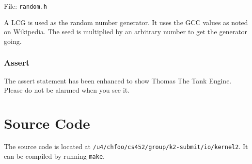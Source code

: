 \documentclass[letterpaper, 12pt]{article}
\begin{document}
File: \texttt{random.h}

A LCG is used as the random number generator. It uses the GCC values as noted on Wikipedia. The seed is multiplied by an arbitrary number to get the generator going.


\subsubsection{Assert%
  \label{assert}%
}

The assert statement has been enhanced to show Thomas The Tank Engine. Please do not be alarmed when you see it.


\section{Source Code%
  \label{source-code}%
}

The source code is located at \texttt{/u4/chfoo/cs452/group/k2-submit/io/kernel2}. It can be compiled by running \texttt{make}.
\end{document}
